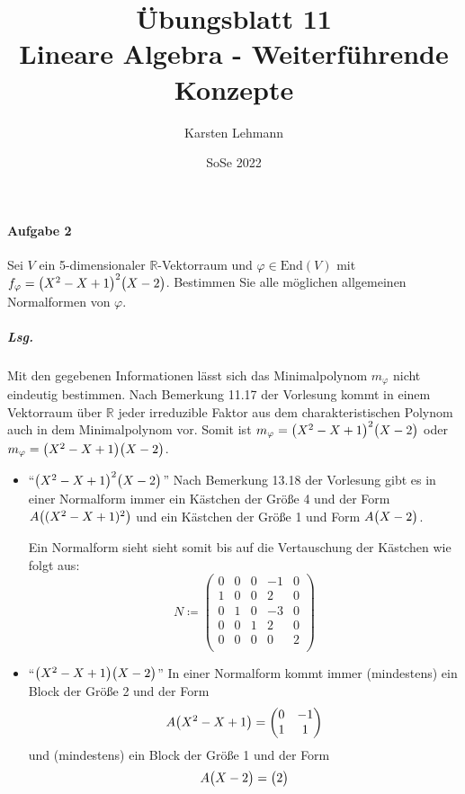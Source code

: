\documentclass{scrreprt}
\author{Karsten Lehmann}
\date{SoSe 2022}
\title{Übungsblatt 11\\Lineare Algebra - Weiterführende Konzepte}
\newcommand\End{\text{End}}
\begin{document}
\paragraph{Aufgabe 2} Sei $V$ ein 5-dimensionaler $\mathbb{R}$-Vektorraum und
$\varphi \in \End(V)$ mit $f_{\varphi} = \qty\big(X^2 - X + 1)^2\qty\big(X - 2)$.
Bestimmen Sie alle möglichen allgemeinen Normalformen von $\varphi$.

\subparagraph{Lsg.} Mit den gegebenen Informationen lässt sich das Minimalpolynom
$m_{\varphi}$ nicht eindeutig bestimmen.
Nach Bemerkung 11.17 der Vorlesung kommt in einem Vektorraum über $\mathbb{R}$
jeder irreduzible Faktor aus dem charakteristischen Polynom auch in dem
Minimalpolynom vor.
Somit ist $m_{\varphi} = \qty\big(X^2 - X + 1)^2\qty\big(X - 2)$ oder
$m_{\varphi} = \qty\big(X^2 - X + 1)\qty\big(X - 2)$.
\begin{itemize}
\item ``$\qty\big(X^2 - X + 1)^2\qty\big(X - 2)$'' Nach Bemerkung 13.18 der
  Vorlesung gibt es in einer Normalform immer ein Kästchen der Größe 4 und der
  Form $A\qty\big((X^2 - X + 1)^2)$ und ein Kästchen der Größe 1 und Form
  $A\qty\big(X - 2)$.

  Ein Normalform sieht sieht somit bis auf die Vertauschung der Kästchen wie
  folgt aus:
  \[
    N \coloneqq \begin{pmatrix}
      0 & 0 & 0 & -1 & 0 \\
      1 & 0 & 0 &  2 & 0 \\
      0 & 1 & 0 & -3 & 0 \\
      0 & 0 & 1 &  2 & 0 \\
      0 & 0 & 0 &  0 & 2 \\
    \end{pmatrix}
  \]

\item ``$\qty\big(X^2 - X + 1)\qty\big(X - 2)$'' In einer Normalform kommt
  immer (mindestens) ein Block der Größe 2 und der Form
  \[
    A\qty\big(X^2 - X + 1) = \begin{pmatrix}
      0 & -1 \\
      1 &  1 \\
    \end{pmatrix}
  \]
  und (mindestens) ein Block der Größe 1 und der Form
  \[
    A\qty\big(X - 2) = \begin{pmatrix}2\end{pmatrix}
  \]


\end{itemize}
\end{document}
